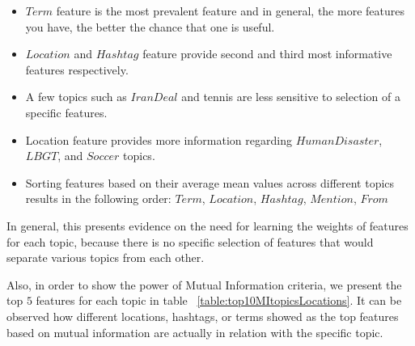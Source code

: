 \begin{itemize}
\item $Term$ feature is the most prevalent feature and in general, the more features you have, the better the chance that one is useful.
\item $Location$ and $Hashtag$ feature provide second and third most informative features respectively.
\item A few topics such as $IranDeal$ and tennis are less sensitive to selection of a specific features.
\item Location feature provides more information regarding $HumanDisaster$, $LBGT$, and $Soccer$ topics.
\item Sorting features based on their average mean values across different topics results in the following order: $Term$, $Location$, $Hashtag$, $Mention$, $From$
\end{itemize}

In general, this presents evidence on the need for learning the weights of features for each topic, because there is no specific selection of features that would separate various topics from each other.

Also, in order to show the power of Mutual Information criteria, we present the top $5$ features for each topic in table ~\ref{table:top10MItopicsLocations}. It can be observed how different locations, hashtags, or terms showed as the top features based on mutual information are actually in relation with the specific topic.

